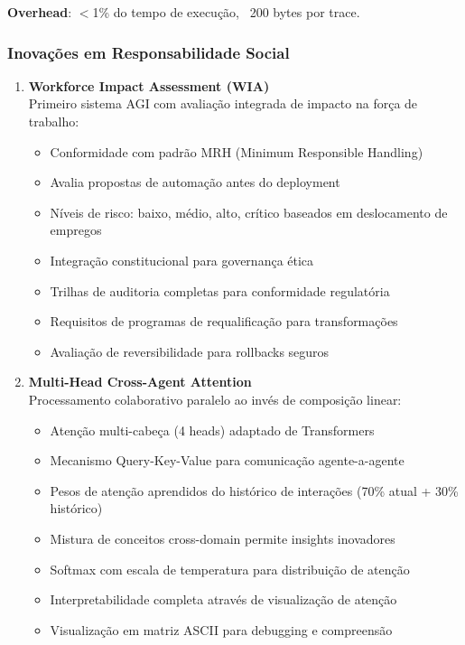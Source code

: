 \documentclass[11pt]{article}
\begin{document}
\textbf{Overhead}: $<$1\% do tempo de execução, ~200 bytes por trace.

\subsubsection{Inovações em Responsabilidade Social}

\begin{enumerate}
    \item \textbf{Workforce Impact Assessment (WIA)} \\
    Primeiro sistema AGI com avaliação integrada de impacto na força de trabalho:
    \begin{itemize}
        \item Conformidade com padrão MRH (Minimum Responsible Handling)
        \item Avalia propostas de automação antes do deployment
        \item Níveis de risco: baixo, médio, alto, crítico baseados em deslocamento de empregos
        \item Integração constitucional para governança ética
        \item Trilhas de auditoria completas para conformidade regulatória
        \item Requisitos de programas de requalificação para transformações
        \item Avaliação de reversibilidade para rollbacks seguros
    \end{itemize}

    \item \textbf{Multi-Head Cross-Agent Attention} \\
    Processamento colaborativo paralelo ao invés de composição linear:
    \begin{itemize}
        \item Atenção multi-cabeça (4 heads) adaptado de Transformers
        \item Mecanismo Query-Key-Value para comunicação agente-a-agente
        \item Pesos de atenção aprendidos do histórico de interações (70\% atual + 30\% histórico)
        \item Mistura de conceitos cross-domain permite insights inovadores
        \item Softmax com escala de temperatura para distribuição de atenção
        \item Interpretabilidade completa através de visualização de atenção
        \item Visualização em matriz ASCII para debugging e compreensão
    \end{itemize}
\end{enumerate}
\end{document}
